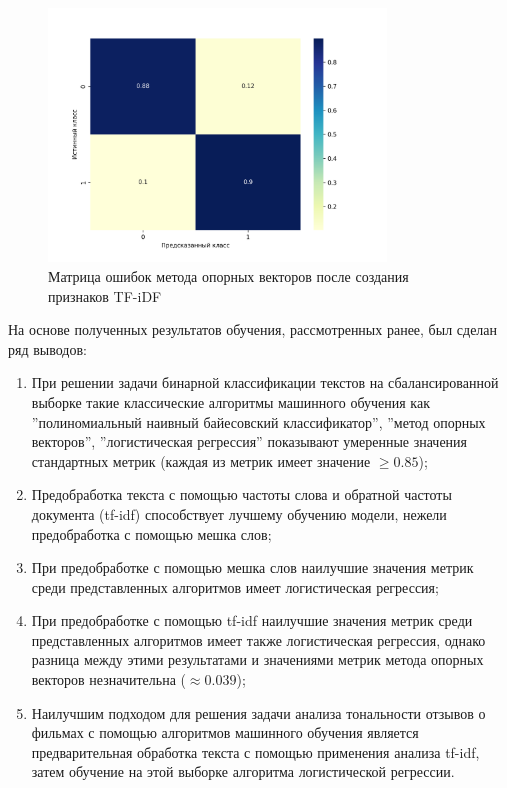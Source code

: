 \documentclass[bachelor, och, coursework]{SCWorks}
\begin{document}
        \begin{figure}[H]
            \centering
            \includegraphics[width=0.8\textwidth]{pic/TFIDF-SVM.png}
            \caption{Матрица ошибок метода опорных векторов после создания признаков TF-iDF}
        \end{figure}

\conclusion

    На основе полученных результатов обучения, рассмотренных ранее, был сделан
    ряд выводов:

    \begin{enumerate}
        \item При решении задачи бинарной классификации текстов на
        сбалансированной выборке такие классические алгоритмы машинного обучения
        как ''полиномиальный наивный байесовский классификатор'', ''метод
        опорных векторов'', ''логистическая регрессия'' показывают умеренные
        значения стандартных метрик (каждая из метрик имеет значение $\geq
        0.85$);
        \item Предобработка текста с помощью частоты слова и обратной частоты
        документа (tf-idf) способствует лучшему обучению модели, нежели
        предобработка с помощью мешка слов;
        \item При предобработке с помощью мешка слов наилучшие значения метрик
        среди представленных алгоритмов имеет логистическая регрессия;
        \item При предобработке с помощью tf-idf наилучшие значения метрик среди
        представленных алгоритмов имеет также логистическая регрессия, однако
        разница между этими результатами и значениями метрик метода опорных
        векторов незначительна ($\approx 0.039$);
        \item Наилучшим подходом для решения задачи анализа тональности отзывов
        о фильмах с помощью алгоритмов машинного обучения является
        предварительная обработка текста с помощью применения анализа tf-idf,
        затем обучение на этой выборке алгоритма логистической регрессии.
    \end{enumerate}
\end{document}
